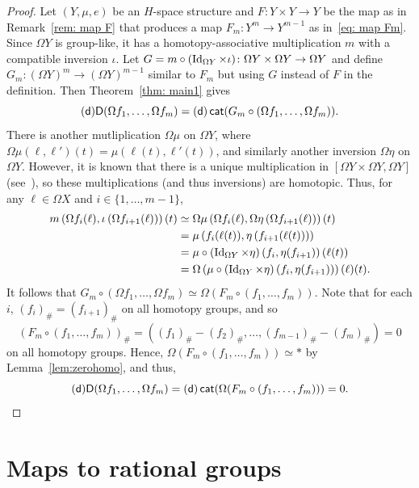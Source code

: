 \documentclass[amscd,amssymb,verbatim,10pt]{amsart}
\numberwithin{equation}{section}
\theoremstyle{plain}
\theoremstyle{definition}
\DeclareMathOperator{\cat}{{\mathsf{cat}}}
\def\id{\protect\operatorname{Id}}
\newcommand{\D}{{\sf {D}}}
\newcommand{\sd}{{(\sf {d})}}
\begin{document}
\begin{proof}
Let $(Y,\mu,e)$ be an $H$-space structure and $F\colon Y\times Y\to Y$ be the map as in Remark~\ref{rem: map F} that produces a map $F_m\colon Y^m\to Y^{m-1}$ as in~\eqref{eq: map Fm}. Since $\Omega Y$ is group-like, it has a homotopy-associative multiplication $m$ with a compatible inversion $\iota$. Let $G=m\circ(\id_{\Omega Y}\times\iota)\colon\Omega Y\times\Omega Y\to \Omega Y$ and define $G_m\colon(\Omega Y)^m\to (\Omega Y)^{m-1}$ similar to $F_m$ but using $G$ instead of $F$ in the definition. Then Theorem~\ref{thm: main1} gives 
\[
\sd\D(\Omega f_1, \dots,\Omega f_m)=\sd\cat(G_m\circ (\Omega f_1, \dots,\Omega f_m)).
\]
There is another mutliplication $\Omega\mu$ on $\Omega Y$, where $\Omega\mu(\ell,\ell')(t)=\mu(\ell(t),\ell'(t))$, and similarly another inversion $\Omega\eta$ on $\Omega Y$. However, it is known that there is a unique multiplication in $[\Omega Y \times \Omega Y,\Omega Y]$ (see~\cite[Theorem 1.5]{Hil}), so these multiplications (and thus inversions) are  homotopic. Thus, for any $\ell\in\Omega X$ and $i\in\{1,\dots,m-1\}$,
\begin{align*}
    m\left(\Omega f_i(\ell),\iota\left(\Omega f_{i+1}(\ell)\right)\right)(t) & \simeq \Omega\mu \left(\Omega f_i(\ell),\Omega\eta\left(\Omega f_{i+1}(\ell)\right)\right)(t)
    \\
    & = \mu\left(f_i(\ell(t)),\eta\left(f_{i+1}(\ell(t))\right)\right)
    \\
    & = \mu\circ \left(\id_{\Omega Y}\times\eta \right) \left(f_i,\eta(f_{i+1})\right)(\ell(t))
    \\
    & = \Omega\left(\mu\circ \left(\id_{\Omega Y}\times\eta \right)\left(f_i,\eta(f_{i+1})\right)\right)(\ell)(t).
\end{align*}
It follows that $G_m\circ (\Omega f_1, \dots,\Omega f_m)\simeq \Omega (F_m\circ (f_1, \dots,f_m))$. Note that for each $i$, $(f_i)_\#=(f_{i+1})_\#$ on all homotopy groups, and so
\[
(F_m\circ (f_1,\dots,f_m))_\#=((f_1)_\#-(f_2)_\#,\dots ,(f_{m-1})_\#-(f_m)_\#)=0
\]
on all homotopy groups. Hence, $\Omega (F_m\circ (f_1, \dots,f_m))\simeq\ast$ by Lemma~\ref{lem:zerohomo}, and thus, 
\[
\sd\D(\Omega f_1, \dots,\Omega f_m)=\sd\cat(\Omega (F_m\circ (f_1, \dots,f_m)))=0.
\]
\end{proof}


\section{Maps to rational groups}\label{sec:mapgroup}
\end{document}
